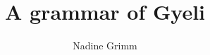 \title{A grammar of Gyeli}
\author{Nadine Grimm}
\renewcommand{\lsSeries}{sidl}%
\renewcommand{\lsSeriesNumber}{}

%
%
%

